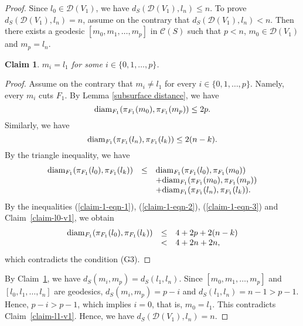 \documentclass[]{aspm}
\newtheorem{claim}[definition]{Claim}
\begin{document}
\begin{proof}
Since $l_0\in \mathcal{D}(V_1)$, we have $d_{S} (\mathcal{D}(V_1), l_n)\leq n$.
To prove $d_{S} (\mathcal{D}(V_1), l_n)=n$, assume on the contrary that $d_{S} (\mathcal{D}(V_1), l_n)<n$.
Then there exists a geodesic $[m_0,m_1,\dots,m_p]$ in $\mathcal{C}(S)$ such that $p<n$, $m_0\in \mathcal{D}(V_1)$ and $m_p=l_n$.

\begin{claim}\label{claim-1}
$m_i=l_1$ for some $i\in\{0,1,\dots,p\}$.
\end{claim}

\begin{proof}
Assume on the contrary that $m_i\neq l_1$ for every $i\in\{0,1,\dots,p\}$.
Namely, every $m_i$ cuts $F_1$.
By Lemma \ref{subsurface distance}, we have
\begin{equation}\label{claim-1-eqn-1}
{\rm diam}_{F_1}(\pi_{F_1}(m_0), \pi_{F_1}(m_p))\leq 2p.
\end{equation}
Similarly, we have 
\begin{equation}\label{claim-1-eqn-2}
{\rm diam}_{F_1}(\pi_{F_1}(l_n), \pi_{F_1}(l_k))\leq 2(n-k).
\end{equation}
By the triangle inequality, we have
\begin{eqnarray}\label{claim-1-eqn-3}
\begin{array}{rcl}
{\rm diam}_{F_1}(\pi_{F_1}(l_0), \pi_{F_1}(l_k)) &\leq& {\rm diam}_{F_1}(\pi_{F_1}(l_0), \pi_{F_1}(m_0))
\\&&+{\rm diam}_{F_1}(\pi_{F_1}(m_0), \pi_{F_1}(m_p))\\&&+{\rm diam}_{F_1}(\pi_{F_1}(l_n), \pi_{F_1}(l_k)).
\end{array}
\end{eqnarray}
By the inequalities (\ref{claim-1-eqn-1}), (\ref{claim-1-eqn-2}), (\ref{claim-1-eqn-3}) and Claim~\ref{claim-l0-v1}, we obtain
\begin{eqnarray}\label{claim-1-eqn-4}
\begin{array}{rcl}
{\rm diam}_{F_1}(\pi_{F_1}(l_0), \pi_{F_1}(l_k)) &\leq& 4+2p+2(n-k)
\\&<& 4+2n+2n,
\end{array}
\end{eqnarray}
which contradicts the condition (G3).
\end{proof}

By Claim~\ref{claim-1}, we have $d_S(m_i,m_p)=d_S(l_1,l_n)$.
Since $[m_0,m_1,\dots,m_p]$ and $[l_0,l_1,\dots,l_n]$ are geodesics, $d_S(m_i,m_p)=p-i$ and $d_S(l_1,l_n)=n-1>p-1$.
Hence, $p-i>p-1$, which implies $i=0$, that is, $m_0=l_1$.
This contradicts Claim~\ref{claim-l1-v1}.
Hence, we have $d_{S} (\mathcal{D}(V_1), l_n)=n$.
\end{proof}
\end{document}
